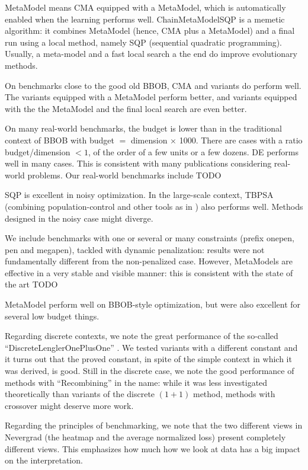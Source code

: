 MetaModel means CMA equipped with a MetaModel, which is automatically enabled when the learning performs well.
ChainMetaModelSQP is a memetic algorithm: it combines MetaModel (hence, CMA plus a MetaModel) and a final run using a local method, namely SQP (sequential quadratic programming).
Usually, a meta-model and a fast local search a the end do improve evolutionary methods.

On benchmarks close to the good old BBOB, CMA and variants do perform well. The variants equipped with a MetaModel perform better, and
variants equipped with the the MetaModel and the final local search are even better.

On many real-world benchmarks, the budget is lower than in the traditional context of BBOB with budget $=$ dimension $\times$ 1000. There
are cases with a ratio budget/dimension $<1$, of the order of a few units or a few dozens. DE performs well in many cases. This is consistent with many publications considering real-world problems. Our real-world benchmarks include TODO

SQP is excellent in noisy optimization. In the large-scale context, TBPSA (combining population-control\cite{mlis} and other tools as in \cite{vasilfoga}) also performs well.
Methods designed in the noisy case might diverge.

We include benchmarks with one or several or many constraints (prefix onepen, pen and megapen), tackled with dynamic penalization: results were not fundamentally different from the non-penalized case. However, MetaModels are effective in a very stable and visible manner: this is consistent with the state of the art TODO

MetaModel perform well on BBOB-style optimization, but were also excellent for several low budget things.

Regarding discrete contexts, we note the great performance of the so-called ``DiscreteLenglerOnePlusOne'' \cite{lengler}. We tested variants with a different constant and it turns out that the proved constant, in spite of the simple context in which it was derived, is good.
Still in the discrete case, we note the good performance of methods with ``Recombining'' in the name: while it was less investigated theoretically than variants of the discrete $(1+1)$ method, methods with crossover might deserve more work.

Regarding the principles of benchmarking, we note that the two different views in Nevergrad (the heatmap and the average normalized loss) present completely different views. This emphasizes how much how we look at data has a big impact on the interpretation.

